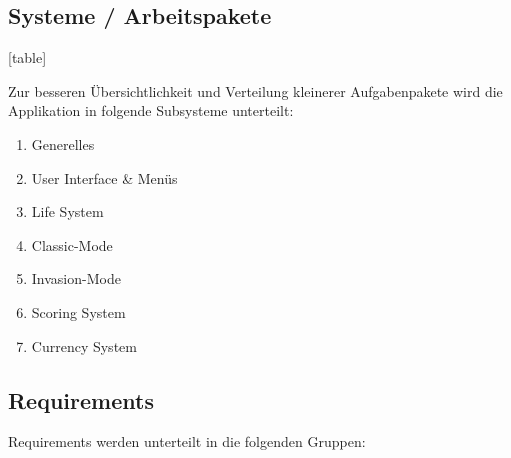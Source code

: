 \subsection{Systeme / Arbeitspakete}

\newcommand{\OPT}[1]{{\color{teal} #1}}


\newcommand{\CAT}{F}
\newcommand{\SYS}{\ref*{sys:ui}}
\newcommand{\setCategory}[1]{ \gdef\CAT{#1} }
\newcommand{\setSystem}[1]{ \gdef\SYS{#1}\hspace*{-9px}\setcounter{rowcntr}{0} }

[table]                             %
\renewcommand{\therowcntr}{\CAT-\SYS-\arabic{rowcntr}}  %


\newcommand{\REQ}[1]{
    \refstepcounter{rowcntr}
    \therowcntr
    \label{#1} 
}




Zur besseren Übersichtlichkeit und Verteilung kleinerer Aufgabenpakete wird die Applikation in folgende
Subsysteme unterteilt:

\begin{enumerate}
    \item \label{sys:gen} Generelles
    \item \label{sys:ui} User Interface \& Menüs
    \item \label{sys:ls} Life System
    \item \label{sys:cm} Classic-Mode
    \item \label{sys:inv} Invasion-Mode
    \item \label{sys:scs} Scoring System
    \item \label{sys:cur} Currency System
\end{enumerate}

\subsection{Requirements}

Requirements werden unterteilt in die folgenden Gruppen:

